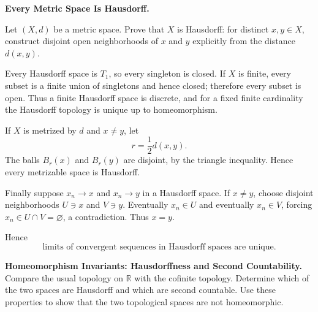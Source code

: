 \begin{problem}[CP-II-0338]
\label{prob:cp-ii-0338}
\textbf{Every Metric Space Is Hausdorff.}

\hspace*{1.5em}Let \((X,d)\) be a metric space. Prove that \(X\) is Hausdorff: for distinct
\(x,y\in X\), construct disjoint open neighborhoods of \(x\) and \(y\)
explicitly from the distance \(d(x,y)\).
\end{problem}

\begin{solution}
Every Hausdorff space is \(T_1\), so every singleton is closed. If \(X\) is finite,
every subset is a finite union of singletons and hence closed; therefore every subset is
open. Thus a finite Hausdorff space is discrete, and for a fixed finite cardinality the
Hausdorff topology is unique up to homeomorphism.

If \(X\) is metrized by \(d\) and \(x\ne y\), let
\[
r=\frac12d(x,y).
\]
The balls \(B_r(x)\) and \(B_r(y)\) are disjoint, by the triangle inequality. Hence
every metrizable space is Hausdorff.

Finally suppose \(x_n\to x\) and \(x_n\to y\) in a Hausdorff space. If \(x\ne y\),
choose disjoint neighborhoods \(U\ni x\) and \(V\ni y\). Eventually \(x_n\in U\) and
eventually \(x_n\in V\), forcing \(x_n\in U\cap V=\varnothing\), a contradiction.
Thus \(x=y\).

Hence
\[
\boxed{\text{limits of convergent sequences in Hausdorff spaces are unique}.}
\]
\end{solution}

\begin{problem}[CP-II-0357]
\label{prob:cp-ii-0357}
\textbf{Homeomorphism Invariants: Hausdorffness and Second Countability.}
Compare the usual topology on \(\mathbb R\) with the cofinite topology.
Determine which of the two spaces are Hausdorff and which are second countable.
Use these properties to show that the two topological spaces are not homeomorphic.
\end{problem}

